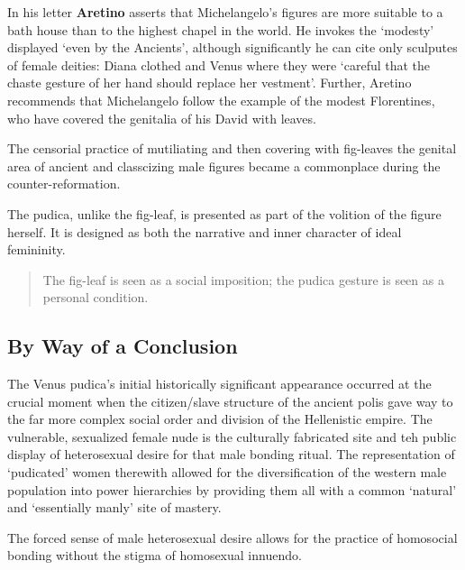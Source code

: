 In his letter \textbf{Aretino} asserts that Michelangelo's figures are more suitable to a bath house than to the highest chapel in the world. He invokes the `modesty' displayed `even by the Ancients', although significantly he can cite only sculputes of female deities: Diana clothed and Venus where they were `careful that the chaste gesture of her hand should replace her vestment'. Further, Aretino recommends that Michelangelo follow the example of the modest Florentines, who have covered the genitalia of his David with leaves.

\begin{nte}
    The censorial practice of mutiliating and then covering with fig-leaves the genital area of ancient and classcizing male figures became a commonplace during the counter-reformation.
\end{nte}

The pudica, unlike the fig-leaf, is presented as part of the volition of the figure herself. It is designed as both the narrative and inner character of ideal femininity. 

\begin{quotation}
    The fig-leaf is seen as a social imposition; the pudica gesture is seen as a personal condition.
\end{quotation}



\subsection{By Way of a Conclusion}

The Venus pudica's initial historically significant appearance occurred at the crucial moment when the citizen/slave structure of the ancient polis gave way to the far more complex social order and division of the Hellenistic empire. The vulnerable, sexualized female nude is the culturally fabricated site and teh public display of heterosexual desire for that male bonding ritual. The representation of `pudicated' women therewith allowed for the diversification of the western male population into power hierarchies by providing them all with a common `natural' and `essentially manly' site of mastery.

\begin{rmk}
    The forced sense of male heterosexual desire allows for the practice of homosocial bonding without the stigma of homosexual innuendo.
\end{rmk}





